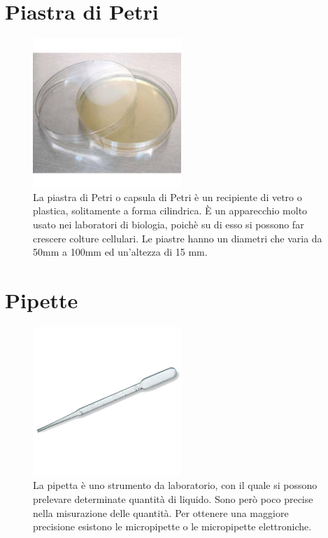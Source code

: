 \documentclass{report}
\begin{document}
	\vspace{0.5cm}


	\section{Piastra di Petri}

	\begin{figure}[H]
		\includegraphics[width=0.5\textwidth]{./immagini/piastra_petri.jpg}
		\caption{La piastra di Petri o capsula di Petri è un recipiente di vetro o plastica,
		solitamente a forma cilindrica. \`E un apparecchio molto usato nei laboratori di biologia,
		poichè su di esso si possono far crescere colture cellulari.
		Le piastre hanno un diametri che varia da 50mm a 100mm ed un'altezza di 15 mm.}
		\label{piastra_petri}
	\end{figure}

	\vspace{0.5cm}

	\section{Pipette}

	\begin{figure}[H]

		\includegraphics[width=0.5\textwidth]{./immagini/pipetta.jpg}
		\caption{La pipetta è uno strumento da laboratorio, con il quale si possono prelevare
		determinate quantità di liquido.
		Sono per\`o poco precise nella misurazione delle quantità.
		Per ottenere una maggiore precisione esistono le micropipette o le micropipette elettroniche.}
		\label{pipetta}

	\end{figure}
\end{document}
